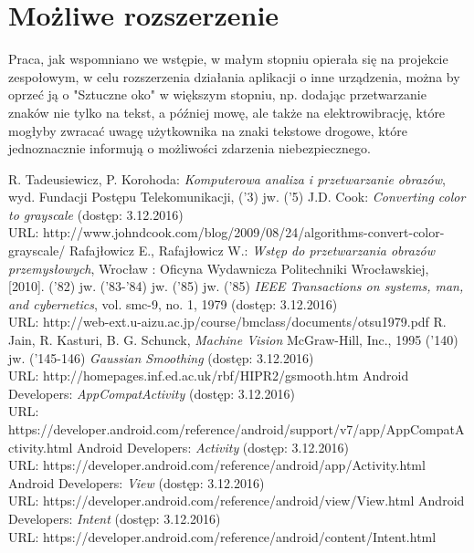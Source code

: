 \documentclass[eng,oneside]{mgr}
\begin{document}
\section{Możliwe rozszerzenie}
Praca, jak wspomniano we wstępie, w małym stopniu opierała się na projekcie zespołowym, w celu rozszerzenia działania aplikacji o inne urządzenia, można by oprzeć ją o "Sztuczne oko" w większym stopniu, np. dodając przetwarzanie znaków nie tylko na tekst, a później mowę, ale także na elektrowibrację, które mogłyby zwracać uwagę użytkownika na znaki tekstowe drogowe, które jednoznacznie informują o możliwości zdarzenia niebezpiecznego.
\begin{thebibliography}{99}
 R. Tadeusiewicz, P. Korohoda: \emph{Komputerowa analiza i przetwarzanie obrazów}, wyd. Fundacji Postępu Telekomunikacji, ('3)
 jw. ('5)
 J.D. Cook: \emph{Converting color to grayscale} (dostęp: 3.12.2016) \\
URL: http://www.johndcook.com/blog/2009/08/24/algorithms-convert-color-grayscale/
 Rafajłowicz E., Rafajłowicz W.: \emph {Wstęp do przetwarzania obrazów przemysłowych}, Wrocław : Oficyna Wydawnicza Politechniki Wrocławskiej, [2010]. ('82) 
 jw. ('83-'84)
 jw. ('85)
 jw. ('85)
 \emph{IEEE Transactions on systems, man, and cybernetics}, vol. smc-9, no. 1, 1979 (dostęp: 3.12.2016) \\
URL: http://web-ext.u-aizu.ac.jp/course/bmclass/documents/otsu1979.pdf
 R. Jain, R. Kasturi, B. G. Schunck, \emph{Machine Vision} McGraw-Hill, Inc., 1995 ('140)
 jw. ('145-146)
 \emph{Gaussian Smoothing} (dostęp: 3.12.2016) \\
URL: http://homepages.inf.ed.ac.uk/rbf/HIPR2/gsmooth.htm
 Android Developers: \emph{AppCompatActivity} (dostęp: 3.12.2016) \\
URL: https://developer.android.com/reference/android/support/v7/app/AppCompatActivity.html
 Android Developers: \emph{Activity} (dostęp: 3.12.2016) \\
URL: https://developer.android.com/reference/android/app/Activity.html
 Android Developers: \emph{View} (dostęp: 3.12.2016) \\
URL: https://developer.android.com/reference/android/view/View.html
 Android Developers: \emph{Intent} (dostęp: 3.12.2016) \\
URL: https://developer.android.com/reference/android/content/Intent.html

\end{thebibliography}
\end{document}
